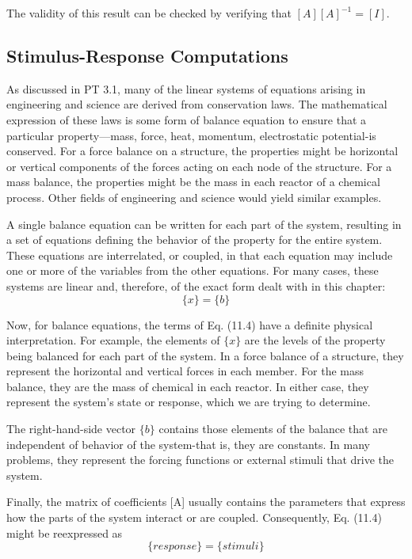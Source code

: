 \documentclass[../main.tex]{subfiles}
\begin{document}
The validity of this result can be checked by verifying that $[A][A]^{-1} = [I]$.

\subsection{Stimulus-Response Computations}
As discussed in PT 3.1, many of the linear systems of equations arising in engineering and science are derived from conservation laws. The mathematical expression of these laws
is some form of balance equation to ensure that a particular property—mass, force, heat,
momentum, electrostatic potential-is conserved. For a force balance on a structure, the
properties might be horizontal or vertical components of the forces acting on each node of the structure. For a mass balance, the properties might be the mass in each reactor of a chemical process. Other fields of engineering and science would yield similar examples.

A single balance equation can be written for each part of the system, resulting in a set
of equations defining the behavior of the property for the entire system. These equations
are interrelated, or coupled, in that each equation may include one or more of the variables from the other equations. For many cases, these systems are linear and, therefore, of the exact form dealt with in this chapter:
\begin{equation}
[A]\{x\}=\{b\}
\tag{11.4}
\end{equation}

Now, for balance equations, the terms of Eq. (11.4) have a definite physical interpretation. For example, the elements of $\{x\}$ are the levels of the property being balanced for each part of the system. In a force balance of a structure, they represent the horizontal and vertical forces in each member. For the mass balance, they are the mass of chemical in each reactor. In either case, they represent the system's state or response, which we are trying to determine.

The right-hand-side vector $\{b\}$ contains those elements of the balance that are independent of behavior of the system-that is, they are constants. In many problems, they
represent the forcing functions or external stimuli that drive the system.

Finally, the matrix of coefficients [A] usually contains the parameters that express
how the parts of the system interact or are coupled. Consequently, Eq. (11.4) might be
reexpressed as
\begin{equation}
[Interactions]\{response\}=\{stimuli\}
\end{equation}
\end{document}
